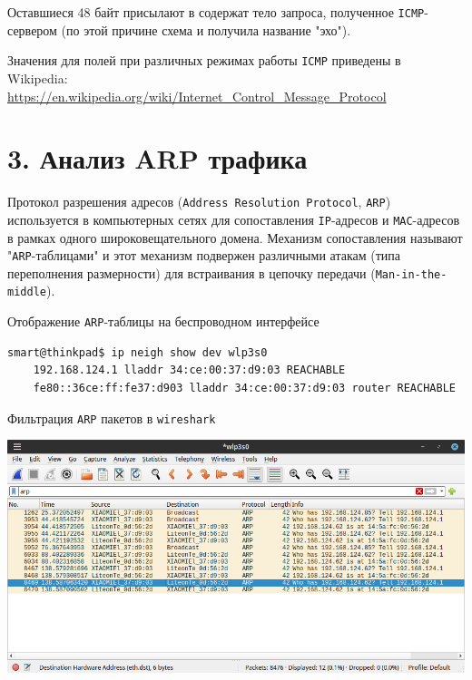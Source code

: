 Оставшиеся 48 байт присылают в содержат тело запроса, полученное \texttt{ICMP}-сервером (по этой причине схема и получила название "эхо").


Значения для полей при различных режимах работы \texttt{ICMP} приведены в Wikipedia:\\\url{https://en.wikipedia.org/wiki/Internet_Control_Message_Protocol}

\section*{3. Анализ ARP трафика}

Протокол разрешения адресов (\texttt{Address Resolution Protocol}, \texttt{ARP}) используется в компьютерных сетях для сопоставления \texttt{IP}-адресов и \texttt{MAC}-адресов в рамках одного широковещательного домена. Механизм сопоставления называют "\texttt{ARP}-таблицами" и этот механизм подвержен различными атакам (типа переполнения размерности) для встраивания в цепочку передачи (\texttt{Man-in-the-middle}).

Отображение \texttt{ARP}-таблицы на беспроводном интерфейсе
\begin{Verbatim}[frame=single,breaklines=true,breakanywhere=true]
    smart@thinkpad$ ip neigh show dev wlp3s0
    192.168.124.1 lladdr 34:ce:00:37:d9:03 REACHABLE 
    fe80::36ce:ff:fe37:d903 lladdr 34:ce:00:37:d9:03 router REACHABLE 
\end{Verbatim}

Фильтрация \texttt{ARP} пакетов в \texttt{wireshark}
\begin{center}
    \includegraphics[scale=0.6]{res/5.wireshark-arp.png}
\end{center}

